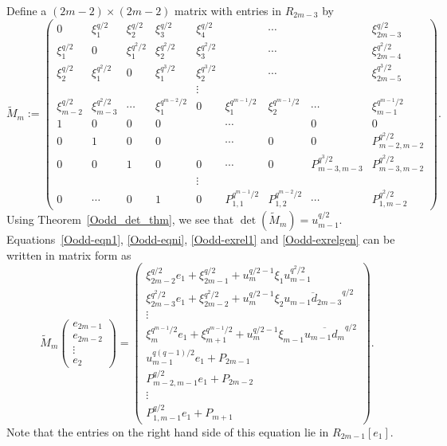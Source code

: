 \documentclass{amsart}
\begin{document}
Define a $(2m-2)\times (2m-2)$ matrix with entries in $R_{2m-3}$ by
\begingroup
\setlength\arraycolsep{2pt}
$$\widetilde{M}_m:=\begin{pmatrix}
      0& \xi_{1}^{q/2}& \xi_{2} ^{q/2}     &\xi_3 ^{q/2}  &\xi_4^{q/2}&& \cdots && \xi_{2m-3}^{q/2}\\
\xi_1^{q/2}& 0         & \xi_{1}^{q^2/2}  & \xi_{2}^{q^2/2}   &  \xi_3^{q^2/2}&& \cdots && \xi_{2m-4}^{q^2/2}\\
\xi_2^{q/2}& \xi_1^{q^2/2}& 0            &\xi_1^{q^3/2} &\xi_2^{q^3/2} && \cdots && \xi_{2m-5}^{q^3/2}\\
&&&&\vdots&&&& \\
\xi_{m-2}^{q/2}&\xi_{m-3}^{q^2/2}&\cdots &\xi_1^{q^{m-2}/2}&0&\xi_1^{q^{m-1}/2}&\xi_2^{q^{m-1}/2}&\cdots &\xi_{m-1}^{q^{m-1}/2}\\
1&0&0&0&& \cdots &&0& 0\\
0&1&0&0&&\cdots &0& 0&P_{m-2,m-2}^{q^2/2}\\
0&0&1&0&0&\cdots &0& P_{m-3,m-3}^{q^3/2}&P_{m-3,m-2}^{q^2/2}\\
&&&&\vdots&&&& \\
0&\cdots&0&1&0&P_{1,1}^{q^{m-1}/2}& P_{1,2}^{q^{m-2}/2}&\cdots&P_{1,m-2}^{q^2/2}
\end{pmatrix}.
$$ 
\endgroup
Using Theorem~\ref{Oodd_det_thm}, we see that $\det(\widetilde{M}_m)=u_{m-1}^{q/2}$.
Equations~\ref{Oodd-eqn1}, \ref{Oodd-eqni}, \ref{Oodd-exrel1} and \ref{Oodd-exrelgen}
can be written in matrix form as 
\begin{equation}\label{Oodd-matrix-eqn}
\widetilde{M}_m \begin{pmatrix} e_{2m-1}\\ e_{2m-2} \\ \vdots\\ e_2 \end{pmatrix} 
=\begin{pmatrix} \xi_{2m-2}^{q/2}e_1+\xi_{2m-1}^{q/2}+u_m^{q/2-1}\xi_1u_{m-1}^{q^2/2}\\ 
\xi_{2m-3}^{q^2/2}e_1+\xi_{2m-2}^{q^2/2}+u_m^{q/2-1}\xi_2\overline{u_{m-1}d_{2m-3}}^{q/2} \\ 
\vdots\\
\xi_m^{q^{m-1}/2}e_1+\xi_{m+1}^{q^{m-1}/2}+u_m^{q/2-1}\xi_{m-1}\overline{u_{m-1}d_m}^{q/2} \\ 
u_{m-1}^{q(q-1)/2}e_1+P_{2m-1} \\
P^{q/2}_{m-2,m-1} e_1+P_{2m-2}\\
\vdots\\
P_{1,m-1}^{q/2} e_1+P_{m+1}\end{pmatrix}.
\end{equation}
Note that the entries on the right hand side of this equation lie in $R_{2m-1}[e_1]$.
\end{document}

